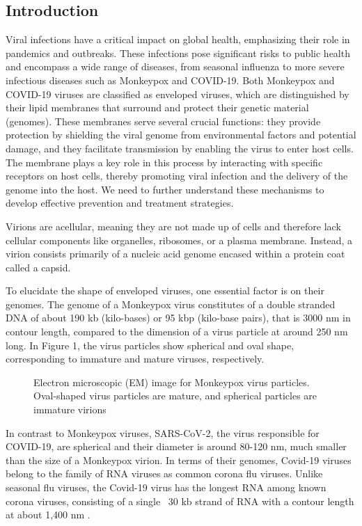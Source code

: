 \documentclass[12pt]{article}
\begin{document}
\begin{flushleft}
\section*{Introduction}

Viral infections have a critical impact on global health, emphasizing their role in pandemics and outbreaks. These infections pose significant risks to public health and encompass a wide range of diseases, from seasonal influenza to more severe infectious diseases such as Monkeypox and COVID-19. Both Monkeypox and COVID-19 viruses are classified as enveloped viruses, which are distinguished by their lipid membranes that surround and protect their genetic material (genomes). These membranes serve several crucial functions: they provide protection by shielding the viral genome from environmental factors and potential damage, and they facilitate transmission by enabling the virus to enter host cells. The membrane plays a key role in this process by interacting with specific receptors on host cells, thereby promoting viral infection and the delivery of the genome into the host. We need to further understand these mechanisms to develop effective prevention and treatment strategies.

Virions are acellular, meaning they are not made up of cells and therefore lack cellular components like organelles, ribosomes, or a plasma membrane. Instead, a virion consists primarily of a nucleic acid genome encased within a protein coat called a capsid. 

To elucidate the shape of enveloped viruses, one essential factor is on their genomes. The genome of a Monkeypox virus constitutes of a double stranded DNA of about 190 kb (kilo-bases) or 95 kbp (kilo-base pairs), that is 3000 nm in contour length, compared to the dimension of a virus particle at around 250 nm long\cite{erez2019diagnosis}\cite{parker2007human}. In Figure 1, the virus particles
show spherical and oval shape, corresponding to
immature and mature viruses, respectively.

\begin{figure}[!ht]
  \centering
  
  \caption{Electron microscopic (EM) image for
Monkeypox virus particles. Oval-shaped
virus particles are mature, and spherical
particles are immature virions \cite{goldsmith2003monkeypox}}
\end{figure}



In contrast to Monkeypox viruses, SARS-CoV-2, the virus responsible for COVID-19, are spherical and their diameter is around 80-120 nm, much smaller than the size of a Monkeypox virion. In terms of
their genomes, Covid-19 viruses belong to the family of
RNA viruses as common corona flu viruses. Unlike
seasonal flu viruses, the Covid-19 virus has the longest
RNA among known corona viruses, consisting of a single
~30 kb strand of RNA with a contour length at about
1,400 nm \cite{baron2020sars}\cite{Wu2022}.


\end{flushleft}
\end{document}
